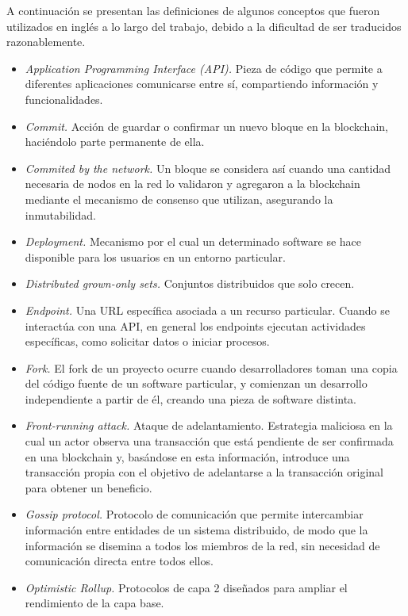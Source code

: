A continuación se presentan las definiciones de algunos conceptos que fueron utilizados
en inglés a lo largo del trabajo, debido a la dificultad de ser traducidos razonablemente.
\begin{itemize}
     \item \textit{Application Programming Interface (API).}  Pieza de código que permite a diferentes
     aplicaciones comunicarse entre sí, compartiendo información y funcionalidades.
     \item \textit{Commit.} Acción de guardar o confirmar un nuevo bloque en la
     blockchain, haciéndolo parte permanente de ella.
     \item \textit{Commited by the network.} Un bloque se considera así cuando una cantidad necesaria de nodos
     en la red lo validaron y agregaron a la blockchain mediante el mecanismo de consenso que utilizan,
     asegurando la inmutabilidad. 
     \item \textit{Deployment.} Mecanismo por el cual un determinado software se hace disponible para los usuarios
     en un entorno particular.
     \item \textit{Distributed grown-only sets.} Conjuntos distribuidos que solo crecen.
     \item \textit{Endpoint.} Una URL específica asociada a un recurso particular. Cuando se interactúa con una API,
     en general los endpoints ejecutan actividades específicas, como solicitar datos o iniciar procesos.
     \item \textit{Fork.} El fork de un proyecto ocurre cuando desarrolladores toman una copia del código fuente de
     un software particular, y comienzan un desarrollo independiente a partir de él, creando una pieza de software
     distinta.
     \item \textit{Front-running attack.} Ataque de adelantamiento. Estrategia maliciosa en la cual un actor
     observa una transacción que está pendiente de ser confirmada en una blockchain y, basándose en esta
     información, introduce una transacción propia con el objetivo de adelantarse a la transacción
     original para obtener un beneficio.
     \item \textit{Gossip protocol.} Protocolo de comunicación que permite intercambiar información
     entre entidades de un sistema distribuido, de modo que la información se disemina a todos los miembros de la red,
     sin necesidad de comunicación directa entre todos ellos.
     \item \textit{Optimistic Rollup.} Protocolos de capa 2 diseñados para ampliar el rendimiento de la capa base.

\end{itemize}

